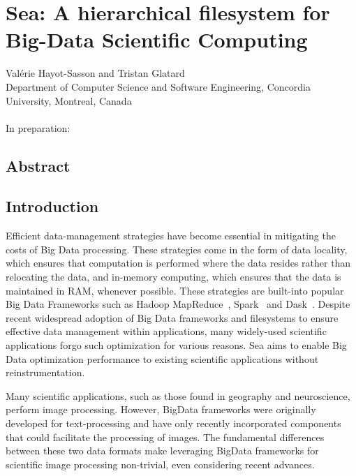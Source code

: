 \chapter{Sea: A hierarchical filesystem for Big-Data Scientific Computing}

Val\'erie Hayot-Sasson and Tristan Glatard \\
\begingroup \footnotesize
Department of Computer Science and Software Engineering, Concordia University, Montreal, Canada \\
\endgroup 
\vspace{5pt} \\
In preparation: \\

\section{Abstract}
\section{Introduction}\label{sec:introduction}
Efficient data-management strategies have become essential in 
mitigating the costs of Big Data processing. These strategies come in the form
of data locality, which ensures that computation is performed where the data resides
rather than relocating the data, and in-memory computing, which ensures that the data is
maintained in RAM, whenever possible. These strategies are built-into popular Big Data Frameworks
such as Hadoop MapReduce~\cite{mapreduce}, Spark~\cite{spark} and Dask~\cite{dask}.
Despite recent widespread adoption of Big Data frameworks and filesystems to ensure effective data
management within applications, many widely-used scientific applications forgo such optimization for various reasons.
Sea aims to enable Big Data optimization performance to existing scientific applications without reinstrumentation.

Many scientific applications, such as those found in geography and neuroscience, perform
image processing. However,  BigData frameworks were originally developed
for text-processing and have only recently incorporated components that could facilitate
the processing of images. The fundamental differences between these two data formats make leveraging
BigData frameworks for
scientific image processing non-trivial, even considering recent advances. 

